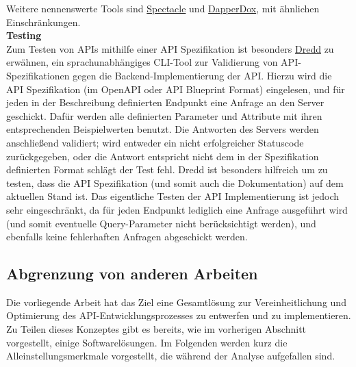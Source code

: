 Weitere nennenswerte Tools sind \href{https://github.com/sourcey/spectacle}{Spectacle} und \href{http://dapperdox.io/}{DapperDox}, mit ähnlichen Einschränkungen.\\

\textbf{Testing}\\
Zum Testen von APIs mithilfe einer API Spezifikation ist besonders \href{http://dredd.io/}{Dredd} zu erwähnen, ein sprachunabhängiges CLI-Tool zur Validierung von API-Spezifikationen gegen die Backend-Implementierung der API. Hierzu wird die API Spezifikation (im OpenAPI oder API Blueprint Format) eingelesen, und für jeden in der Beschreibung definierten Endpunkt eine Anfrage an den Server geschickt. Dafür werden alle definierten Parameter und Attribute mit ihren entsprechenden Beispielwerten benutzt. Die Antworten des Servers werden anschließend validiert; wird entweder ein nicht erfolgreicher Statuscode zurückgegeben, oder die Antwort entspricht nicht dem in der Spezifikation definierten Format schlägt der Test fehl. Dredd ist besonders hilfreich um zu testen, dass die API Spezifikation (und somit auch die Dokumentation) auf dem aktuellen Stand ist. Das eigentliche Testen der API Implementierung ist jedoch sehr eingeschränkt, da für jeden Endpunkt lediglich eine Anfrage ausgeführt wird (und somit eventuelle Query-Parameter nicht berücksichtigt werden), und ebenfalls keine fehlerhaften Anfragen abgeschickt werden.

\subsection{Abgrenzung von anderen Arbeiten}

Die vorliegende Arbeit hat das Ziel eine Gesamtlösung zur Vereinheitlichung und Optimierung des API-Entwicklungsprozesses zu entwerfen und zu implementieren. Zu Teilen dieses Konzeptes gibt es bereits, wie im vorherigen Abschnitt vorgestellt, einige Softwarelösungen. Im Folgenden werden kurz die Alleinstellungsmerkmale vorgestellt, die während der Analyse aufgefallen sind.\\

